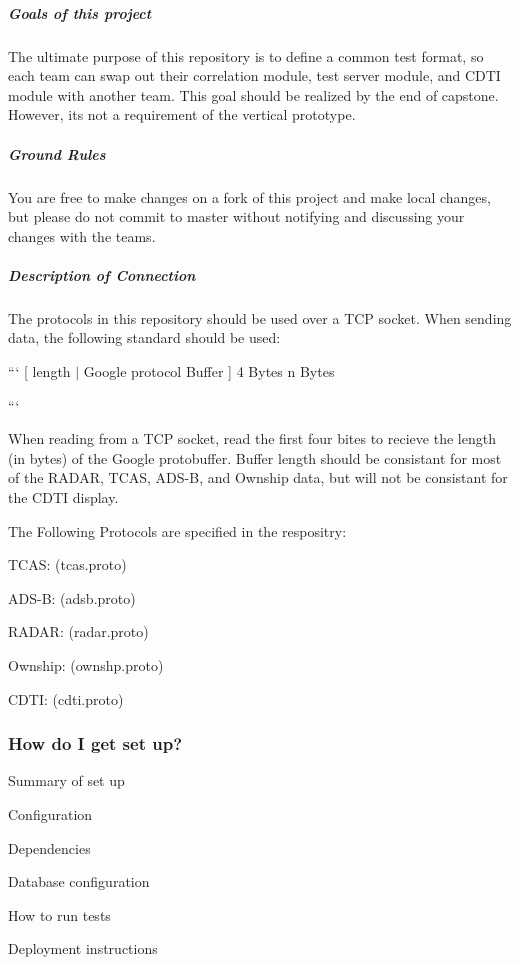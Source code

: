 \subparagraph*{Goals of this project}

The ultimate purpose of this repository is to define a common test format, so each team can swap out their correlation module, test server module, and C\+D\+T\+I module with another team. This goal should be realized by the end of capstone. However, it\textquotesingle{}s not a requirement of the vertical prototype.

\subparagraph*{Ground Rules}

You are free to make changes on a fork of this project and make local changes, but please do not commit to master without notifying and discussing your changes with the teams.

\subparagraph*{Description of Connection}

The protocols in this repository should be used over a T\+C\+P socket. When sending data, the following standard should be used\+:

``` \mbox{[} length $\vert$ Google protocol Buffer \mbox{]} 4 Bytes n Bytes

```

When reading from a T\+C\+P socket, read the first four bites to recieve the length (in bytes) of the Google protobuffer. Buffer length should be consistant for most of the R\+A\+D\+A\+R, T\+C\+A\+S, A\+D\+S-\/\+B, and Ownship data, but will not be consistant for the C\+D\+T\+I display.

The Following Protocols are specified in the respositry\+:
\begin{DoxyItemize}
\item T\+C\+A\+S\+: (tcas.\+proto)
\item A\+D\+S-\/\+B\+: (adsb.\+proto)
\item R\+A\+D\+A\+R\+: (radar.\+proto)
\item Ownship\+: (ownshp.\+proto)
\item C\+D\+T\+I\+: (cdti.\+proto)
\end{DoxyItemize}

\subsubsection*{How do I get set up?}


\begin{DoxyItemize}
\item Summary of set up
\item Configuration
\item Dependencies
\item Database configuration
\item How to run tests
\item Deployment instructions
\end{DoxyItemize}


